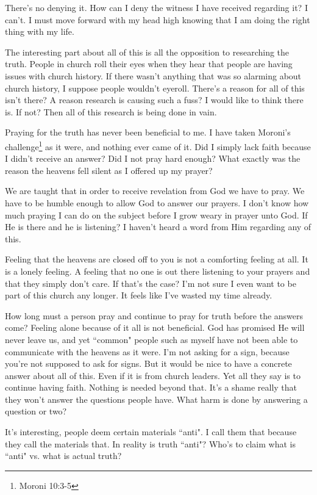 \documentclass{article}
\begin{document}
There's no denying it. How can I deny the witness I have received regarding it?
I can't. I must move forward with my head high knowing that I am doing the right
thing with my life.

The interesting part about all of this is all the opposition to researching the
truth. People in church roll their eyes when they hear that people are having
issues with church history. If there wasn't anything that was so alarming
about church history, I suppose people wouldn't eyeroll. There's a reason for
all of this isn't there? A reason research is causing such a fuss? I would like
to think there is. If not? Then all of this research is being done in vain.

Praying for the truth has never been beneficial to me. I have taken Moroni's
challenge\footnote{Moroni 10:3-5} as it were, and nothing ever came of it. 
Did I simply lack faith because I didn't receive an answer? Did I not pray hard 
enough? What exactly was the reason the heavens fell silent as I offered up 
my prayer?

We are taught that in order to receive revelation from God we have to pray.
We have to be humble enough to allow God to answer our prayers. I don't know how
much praying I can do on the subject before I grow weary in prayer unto God. If
He is there and he is listening? I haven't heard a word from Him regarding any
of this.

Feeling that the heavens are closed off to you is not a comforting feeling at
all. It is a lonely feeling. A feeling that no one is out there listening to
your prayers and that they simply don't care. If that's the case? I'm not sure I
even want to be part of this church any longer. It feels like I've wasted my
time already.

How long must a person pray and continue to pray for truth before the answers
come? Feeling alone because of it all is not beneficial. God has promised He
will never leave us, and yet ``common" people such as myself have not been able
to communicate with the heavens as it were. I'm not asking for a sign, because
you're not supposed to ask for signs. But it would be nice to have a concrete
answer about all of this. Even if it is from church leaders. Yet all they say is
to continue having faith. Nothing is needed beyond that. It's a shame really
that they won't answer the questions people have. What harm is done by answering
a question or two?

It's interesting, people deem certain materials ``anti". I call them that 
because they call the materials that. In reality is truth ``anti"? Who's to 
claim what is ``anti" vs. what is actual truth?
\end{document}
